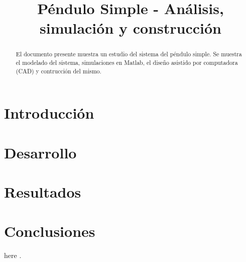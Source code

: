 \documentclass[conference]{IEEEtran}
\begin{document}
\title{
Péndulo Simple - Análisis, simulación y construcción\\
}


\author{
}

\maketitle

\begin{abstract}
El documento presente muestra un estudio del sistema del péndulo simple. 
Se muestra el modelado del sistema, simulaciones en Matlab, el diseño asistido por computadora (CAD) y contrucción del mismo.

\end{abstract}


\section{Introducción}


\section{Desarrollo}


\section{Resultados}


\section{Conclusiones}


here \cite{susskind}.



\end{document}
